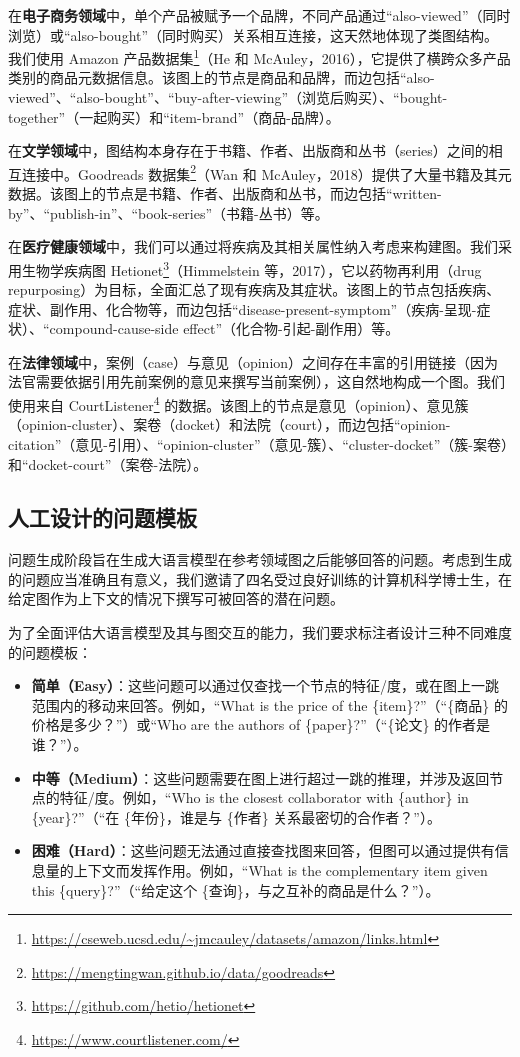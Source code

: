 \documentclass[11pt,UTF8,fontset=fandol]{ctexart}
\begin{document}
在\textbf{电子商务领域}中，单个产品被赋予一个品牌，不同产品通过“also-viewed”（同时浏览）或“also-bought”（同时购买）关系相互连接，这天然地体现了类图结构。我们使用 Amazon 产品数据集\footnote{\url{https://cseweb.ucsd.edu/~jmcauley/datasets/amazon/links.html}}（He 和 McAuley，2016），它提供了横跨众多产品类别的商品元数据信息。该图上的节点是商品和品牌，而边包括“also-viewed”、“also-bought”、“buy-after-viewing”（浏览后购买）、“bought-together”（一起购买）和“item-brand”（商品-品牌）。

在\textbf{文学领域}中，图结构本身存在于书籍、作者、出版商和丛书（series）之间的相互连接中。Goodreads 数据集\footnote{\url{https://mengtingwan.github.io/data/goodreads}}（Wan 和 McAuley，2018）提供了大量书籍及其元数据。该图上的节点是书籍、作者、出版商和丛书，而边包括“written-by”、“publish-in”、“book-series”（书籍-丛书）等。

在\textbf{医疗健康领域}中，我们可以通过将疾病及其相关属性纳入考虑来构建图。我们采用生物学疾病图 Hetionet\footnote{\url{https://github.com/hetio/hetionet}}（Himmelstein 等，2017），它以药物再利用（drug repurposing）为目标，全面汇总了现有疾病及其症状。该图上的节点包括疾病、症状、副作用、化合物等，而边包括“disease-present-symptom”（疾病-呈现-症状）、“compound-cause-side effect”（化合物-引起-副作用）等。

在\textbf{法律领域}中，案例（case）与意见（opinion）之间存在丰富的引用链接（因为法官需要依据引用先前案例的意见来撰写当前案例），这自然地构成一个图。我们使用来自 CourtListener\footnote{\url{https://www.courtlistener.com/}} 的数据。该图上的节点是意见（opinion）、意见簇（opinion-cluster）、案卷（docket）和法院（court），而边包括“opinion-citation”（意见-引用）、“opinion-cluster”（意见-簇）、“cluster-docket”（簇-案卷）和“docket-court”（案卷-法院）。

\subsection{人工设计的问题模板}

问题生成阶段旨在生成大语言模型在参考领域图之后能够回答的问题。考虑到生成的问题应当准确且有意义，我们邀请了四名受过良好训练的计算机科学博士生，在给定图作为上下文的情况下撰写可被回答的潜在问题。

为了全面评估大语言模型及其与图交互的能力，我们要求标注者设计三种不同难度的问题模板：

\begin{itemize}[leftmargin=1.4em]
\item \textbf{简单（Easy）}：这些问题可以通过仅查找一个节点的特征/度，或在图上一跳范围内的移动来回答。例如，“What is the price of the \{item\}?”（“\{商品\} 的价格是多少？”）或“Who are the authors of \{paper\}?”（“\{论文\} 的作者是谁？”）。
\item \textbf{中等（Medium）}：这些问题需要在图上进行超过一跳的推理，并涉及返回节点的特征/度。例如，“Who is the closest collaborator with \{author\} in \{year\}?”（“在 \{年份\}，谁是与 \{作者\} 关系最密切的合作者？”）。
\item \textbf{困难（Hard）}：这些问题无法通过直接查找图来回答，但图可以通过提供有信息量的上下文而发挥作用。例如，“What is the complementary item given this \{query\}?”（“给定这个 \{查询\}，与之互补的商品是什么？”）。
\end{itemize}
\end{document}
